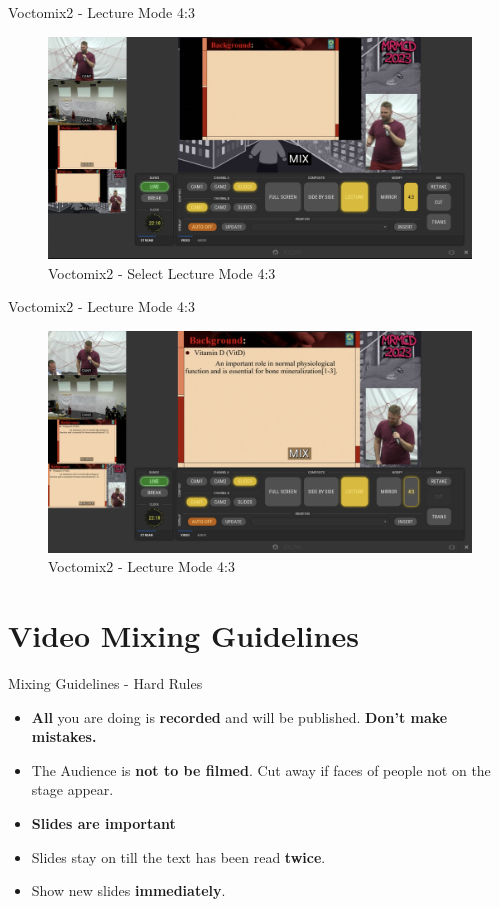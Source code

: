 \begin{frame}{Voctomix2 - Lecture Mode 4:3}
	\begin{figure} 
		\centering
		\includegraphics[width=.9\textwidth]{images/voctomix2-lecture_43_select.jpg}
		\caption{Voctomix2 - Select Lecture Mode 4:3}
	\end{figure}
\end{frame}

\begin{frame}{Voctomix2 - Lecture Mode 4:3}
	\begin{figure} 
		\centering
		\includegraphics[width=.9\textwidth]{images/voctomix2-lecture_43.jpg}
		\caption{Voctomix2 - Lecture Mode 4:3}
	\end{figure}
\end{frame}

\section{Video Mixing Guidelines}
\begin{frame}{Mixing Guidelines - Hard Rules}
	\begin{itemize}
		\item \textbf{All} you are doing is \textbf{recorded} and will be published. \alert{\textbf{Don't make mistakes.}}
		\item The Audience is \textbf{not to be filmed}. Cut away if faces of people not on the stage appear.
		\item \textbf{Slides are important}
		\item Slides stay on till the text has been read \textbf{twice}.
		\item Show new slides \textbf{immediately}.
	\end{itemize}
\end{frame}

